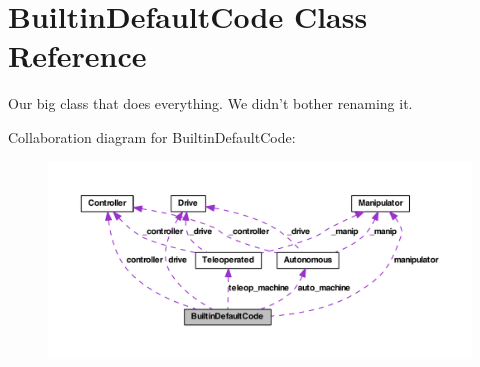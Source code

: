 \hypertarget{class_builtin_default_code}{
\section{BuiltinDefaultCode Class Reference}
\label{class_builtin_default_code}
}


Our big class that does everything. We didn't bother renaming it.  




Collaboration diagram for BuiltinDefaultCode:
\nopagebreak
\begin{figure}[H]
\begin{center}
\leavevmode
\includegraphics[width=400pt]{class_builtin_default_code__coll__graph}
\end{center}
\end{figure}
